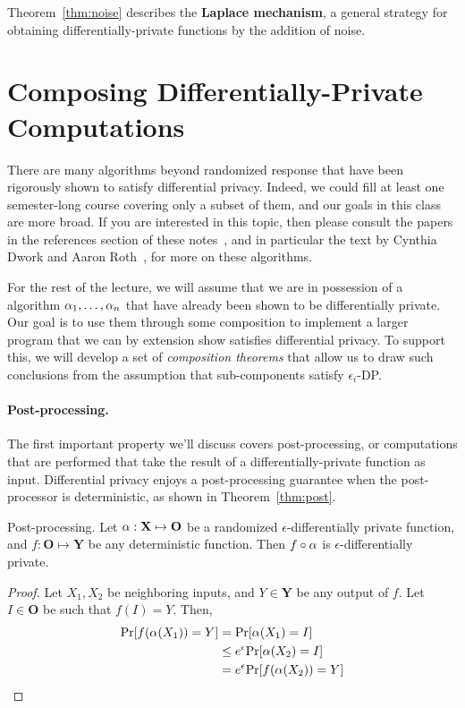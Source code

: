\documentclass[11pt,twoside]{scrartcl}
\begin{document}
Theorem~\ref{thm:noise} describes the \textbf{Laplace mechanism}, a general strategy for obtaining differentially-private functions by the addition of noise.

\section{Composing Differentially-Private Computations}

There are many algorithms beyond randomized response that have been rigorously shown to satisfy differential privacy. Indeed, we could fill at least one semester-long course covering only a subset of them, and our goals in this class are more broad. If you are interested in this topic, then please consult the papers in the references section of these notes~\cite{Chaudhuri2011,ErlingssonKP14,McSherry2009}, and in particular the text by Cynthia Dwork and Aaron Roth~\cite{Dwork2014}, for more on these algorithms.

For the rest of the lecture, we will assume that we are in possession of a algorithm $\alpha_1, \ldots, \alpha_n$ that have already been shown to be differentially private. Our goal is to use them through some composition to implement a larger program that we can by extension show satisfies differential privacy. To support this, we will develop a set of \emph{composition theorems} that allow us to draw such conclusions from the assumption that sub-components satisfy $\epsilon_i$-DP.

\paragraph{Post-processing.} The first important property we'll discuss covers post-processing, or computations that are performed that take the result of a differentially-private function as input. Differential privacy enjoys a post-processing guarantee when the post-processor is deterministic, as shown in Theorem~\ref{thm:post}.

\begin{theorem}{Post-processing.}
\label{thm:post}
Let $\alpha : \mathbf{X} \mapsto \mathbf{O}$ be a randomized $\epsilon$-differentially private function, and $f : \mathbf{O} \mapsto \mathbf{Y}$ be any deterministic function. Then $f \circ \alpha$ is $\epsilon$-differentially private.
\end{theorem}

\begin{proof}
Let $X_1, X_2$ be neighboring inputs, and $Y \in \mathbf{Y}$ be any output of $f$. Let $I \in \mathbf{O}$ be such that $f(I) = Y$. Then,
\begin{align*}
\mathrm{Pr}[f(\alpha(X_1)) = Y] &= \mathrm{Pr}[\alpha(X_1) = I] \\
&\le e^\epsilon\mathrm{Pr}[\alpha(X_2) = I] \\
&= e^\epsilon\mathrm{Pr}[f(\alpha(X_2)) = Y]
\end{align*}
\end{proof}
\end{document}
